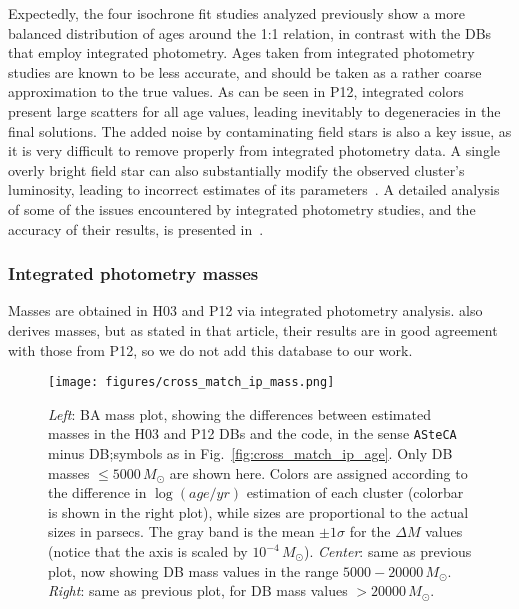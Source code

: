 \documentclass{aa}
\begin{document}
Expectedly, the four isochrone fit studies analyzed previously show a more
balanced distribution of ages around the 1:1 relation, in contrast with the DBs
that employ integrated photometry.
%
Ages taken from integrated photometry studies are known to be less
accurate, and should be taken as a rather coarse approximation to the true
values.
As can be seen in P12, integrated colors present large scatters for
all age values, leading inevitably to degeneracies in the final solutions.
The added noise by contaminating field stars is also a key issue, as it is
very difficult to remove properly from integrated photometry data. A
single overly bright field star can also substantially modify the observed
cluster's luminosity, leading to incorrect estimates of its
parameters~\citep{Baumgardt_2013,Piatti_2014_B88}.
A detailed analysis of some of the issues encountered by integrated photometry
studies, and the accuracy of their results, is presented
in~\cite{Anders_2013}.



\subsubsection{Integrated photometry masses}
\label{sssec:integ_photom_masses}
%
%
%
%
Masses are obtained in H03 and P12 via integrated photometry analysis.
\cite{Baumgardt_2013} also derives masses, but as stated in that article, their
results are in good agreement with those from P12, so we do not add this
database to our work.

\begin{figure*}
\texttt{[image: figures/cross\_match\_ip\_mass.png]}
\caption{\emph{Left}: BA mass plot, showing the differences between estimated
masses in the H03 and P12 DBs and the code, in the sense \texttt{ASteCA} minus
DB;\@ symbols as in Fig.~\ref{fig:cross_match_ip_age}.
Only DB masses ${\le}5000\,M_{\odot}$ are shown here.
Colors are assigned according to the difference in $\log(age/yr)$ estimation of
each cluster (colorbar is shown in the right plot), while sizes are proportional to
the actual sizes in parsecs. The gray band is the mean $\pm 1\sigma$ for the
$\Delta M$ values (notice that the axis is scaled by $10^{-4}\,M_{\odot}$).
\emph{Center}: same as previous plot, now showing DB mass values in the range
$5000-20000\,M_{\odot}$.
\emph{Right}: same as previous plot, for DB mass values ${>}20000\,M_{\odot}$.
}
\label{fig:cross_match_ip_mass}
\end{figure*}
\end{document}

